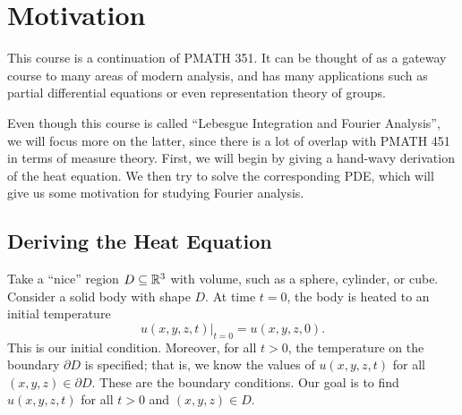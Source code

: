 \section{Motivation}\label{sec:1}
This course is a continuation of PMATH 351. It can be thought of 
as a gateway course to many areas of modern analysis, and has 
many applications such as partial differential equations or even
representation theory of groups.

Even though this course is called ``Lebesgue Integration and Fourier Analysis'',
we will focus more on the latter, since there is a lot of overlap with 
PMATH 451 in terms of measure theory. First, we will begin by giving a 
hand-wavy derivation of the heat equation. We then try to solve the 
corresponding PDE, which will give us some motivation for studying 
Fourier analysis. 

\subsection{Deriving the Heat Equation}\label{subsec:1.1}
Take a ``nice'' region $D \subseteq \mathbb{R}^3$ with volume, such as a sphere, 
cylinder, or cube. Consider a solid body with shape $D$. At time $t = 0$, 
the body is heated to an initial temperature 
\[ u(x, y, z, t)|_{t=0} = u(x, y, z, 0). \] 
This is our initial condition. Moreover, for all $t > 0$, the temperature on 
the boundary $\partial D$ is specified; that is, we know the values of 
$u(x, y, z, t)$ for all $(x, y, z) \in \partial D$. These are the boundary 
conditions. Our goal is to find $u(x, y, z, t)$ for all $t > 0$ and 
$(x, y, z) \in D$. 

